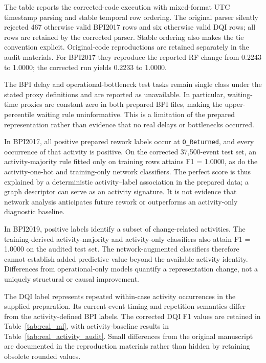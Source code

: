 \documentclass[pdflatex,iicol,Numbered,sn-basic]{sn-jnl}
\begin{document}
The table reports the corrected-code execution with mixed-format UTC timestamp parsing and stable temporal row ordering. The original parser silently rejected 467 otherwise valid BPI2017 rows and six otherwise valid DQI rows; all rows are retained by the corrected parser. Stable ordering also makes the tie convention explicit. Original-code reproductions are retained separately in the audit materials. For BPI2017 they reproduce the reported RF change from 0.2243 to 1.0000; the corrected run yields 0.2233 to 1.0000.

The BPI delay and operational-bottleneck test tasks remain single class under the stated proxy definitions and are reported as unavailable. In particular, waiting-time proxies are constant zero in both prepared BPI files, making the upper-percentile waiting rule uninformative. This is a limitation of the prepared representation rather than evidence that no real delays or bottlenecks occurred.

In BPI2017, all positive prepared rework labels occur at \texttt{O\_Returned}, and every occurrence of that activity is positive. On the corrected 37,500-event test set, an activity-majority rule fitted only on training rows attains F1 = 1.0000, as do the activity-one-hot and training-only network classifiers. The perfect score is thus explained by a deterministic activity--label association in the prepared data; a graph descriptor can serve as an activity signature. It is not evidence that network analysis anticipates future rework or outperforms an activity-only diagnostic baseline.

In BPI2019, positive labels identify a subset of change-related activities. The training-derived activity-majority and activity-only classifiers also attain F1 = 1.0000 on the audited test set. The network-augmented classifiers therefore cannot establish added predictive value beyond the available activity identity. Differences from operational-only models quantify a representation change, not a uniquely structural or causal improvement.

The DQI label represents repeated within-case activity occurrences in the supplied preparation. Its current-event timing and repetition semantics differ from the activity-defined BPI labels. The corrected DQI F1 values are retained in Table~\ref{tab:real_ml}, with activity-baseline results in Table~\ref{tab:real_activity_audit}. Small differences from the original manuscript are documented in the reproduction materials rather than hidden by retaining obsolete rounded values.
\end{document}
